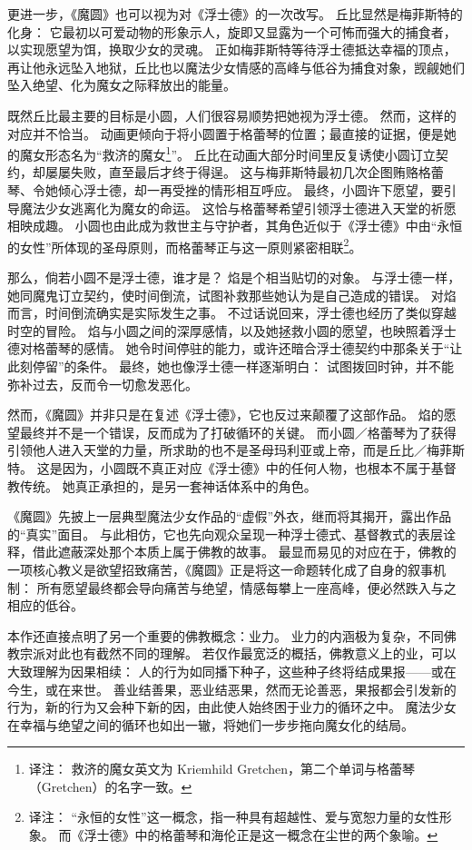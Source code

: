 更进一步，《魔圆》也可以视为对《浮士德》的一次改写。
丘比显然是梅菲斯特的化身：
它最初以可爱动物的形象示人，旋即又显露为一个可怖而强大的捕食者，以实现愿望为饵，换取少女的灵魂。
正如梅菲斯特等待浮士德抵达幸福的顶点，再让他永远坠入地狱，丘比也以魔法少女情感的高峰与低谷为捕食对象，觊觎她们坠入绝望、化为魔女之际释放出的能量。

既然丘比最主要的目标是小圆，人们很容易顺势把她视为浮士德。
然而，这样的对应并不恰当。
动画更倾向于将小圆置于格蕾琴的位置；最直接的证据，便是她的魔女形态名为“救济的魔女\footnote{%
    译注：
    救济的魔女英文为 Kriemhild Gretchen，第二个单词与格蕾琴（Gretchen）的名字一致。
}”。
丘比在动画大部分时间里反复诱使小圆订立契约，却屡屡失败，直至最后才终于得逞。
这与梅菲斯特最初几次企图贿赂格蕾琴、令她倾心浮士德，却一再受挫的情形相互呼应。
最终，小圆许下愿望，要引导魔法少女逃离化为魔女的命运。
这恰与格蕾琴希望引领浮士德进入天堂的祈愿相映成趣。
小圆也由此成为救世主与守护者，其角色近似于《浮士德》中由“永恒的女性”所体现的圣母原则，而格蕾琴正与这一原则紧密相联\footnote{%
    译注：
    “永恒的女性”这一概念，指一种具有超越性、爱与宽恕力量的女性形象。
    而《浮士德》中的格蕾琴和海伦正是这一概念在尘世的两个象喻。
}\cite{obrien2012eternal-feminine}。


那么，倘若小圆不是浮士德，谁才是？
焰是个相当贴切的对象。
与浮士德一样，她同魔鬼订立契约，使时间倒流，试图补救那些她认为是自己造成的错误。
对焰而言，时间倒流确实是实际发生之事。
不过话说回来，浮士德也经历了类似穿越时空的冒险。
焰与小圆之间的深厚感情，以及她拯救小圆的愿望，也映照着浮士德对格蕾琴的感情。
她令时间停驻的能力，或许还暗合浮士德契约中那条关于“让此刻停留”的条件。
最终，她也像浮士德一样逐渐明白：
试图拨回时钟，并不能弥补过去，反而令一切愈发恶化。

然而，《魔圆》并非只是在复述《浮士德》，它也反过来颠覆了这部作品。
焰的愿望最终并不是一个错误，反而成为了打破循环的关键。
而小圆／格蕾琴为了获得引领他人进入天堂的力量，所求助的也不是圣母玛利亚或上帝，而是丘比／梅菲斯特。
这是因为，小圆既不真正对应《浮士德》中的任何人物，也根本不属于基督教传统。
她真正承担的，是另一套神话体系中的角色。

《魔圆》先披上一层典型魔法少女作品的“虚假”外衣，继而将其揭开，露出作品的“真实”面目。
与此相仿，它也先向观众呈现一种浮士德式、基督教式的表层诠释，借此遮蔽深处那个本质上属于佛教的故事。
最显而易见的对应在于，佛教的一项核心教义是欲望招致痛苦\cite{smart1998buddhism}，《魔圆》正是将这一命题转化成了自身的叙事机制：
所有愿望最终都会导向痛苦与绝望，情感每攀上一座高峰，便必然跌入与之相应的低谷。

本作还直接点明了另一个重要的佛教概念：业力。
业力的内涵极为复杂，不同佛教宗派对此也有截然不同的理解。
若仅作最宽泛的概括，佛教意义上的业，可以大致理解为因果相续：
人的行为如同播下种子，这些种子终将结成果报——或在今生，或在来世。
善业结善果，恶业结恶果，然而无论善恶，果报都会引发新的行为，新的行为又会种下新的因，由此使人始终困于业力的循环之中\cite{smart1998buddhism}。
魔法少女在幸福与绝望之间的循环也如出一辙，将她们一步步拖向魔女化的结局。


